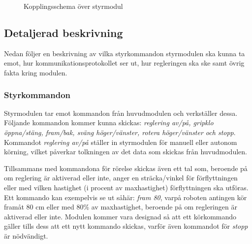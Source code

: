 \documentclass[11pt]{article}
\begin{document}
\begin{flushleft}
\begin{figure}[htbp]
\centering
\noindent{}
	\caption{Kopplingsschema över styrmodul \label{kopplingsschema:styrmodul}}	
\end{figure}
 
\subsection{Detaljerad beskrivning}
Nedan följer en beskrivning av vilka styrkommandon styrmodulen ska kunna ta emot, hur kommunikationsprotokollet ser ut, hur regleringen ska ske samt övrig fakta kring modulen.

\subsubsection{Styrkommandon}\label{Styrkommandon}
Styrmodulen tar emot kommandon från huvudmodulen och verkställer dessa. Följande kommandon kommer kunna skickas: \textit{reglering av/på, gripklo öppna/stäng, fram/bak, sväng höger/vänster, rotera höger/vänster och stopp}. Kommandot \textit{reglering av/på} ställer in styrmodulen för manuell eller autonom körning, vilket påverkar tolkningen av det data som skickas från huvudmodulen.

Tillsammans med kommandona för rörelse skickas även ett tal som, beroende på om reglering är aktiverad eller inte, anger en sträcka/vinkel för förflyttningen eller med vilken hastighet (i procent av maxhastighet) förflyttningen ska utföras. Ett kommando kan exempelvis se ut såhär: \textit{fram 80}, varpå roboten antingen kör framåt 80 cm eller med 80\% av maxhastighet, beroende på om regleringen är aktiverad eller inte. Modulen kommer vara designad så att ett körkommando gäller tills dess att ett nytt kommando skickas, varför även kommandot för \textit{stopp} är nödvändigt.


\end{flushleft}
\end{document}
